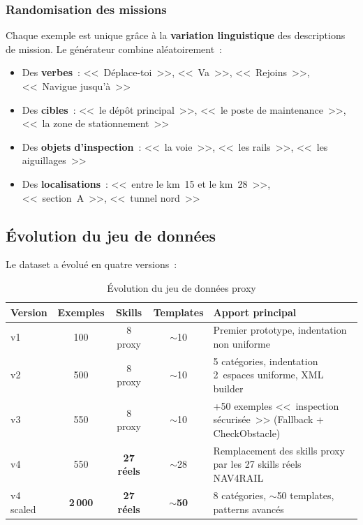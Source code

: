 \documentclass[a4paper,11pt]{article}
\begin{document}
\subsubsection{Randomisation des missions}

Chaque exemple est unique grâce à la \textbf{variation linguistique} des
descriptions de mission. Le générateur combine aléatoirement~:

\begin{itemize}
    \item Des \textbf{verbes}~: <<~Déplace-toi~>>, <<~Va~>>,
    <<~Rejoins~>>, <<~Navigue jusqu'à~>>
    \item Des \textbf{cibles}~: <<~le dépôt principal~>>, <<~le poste de
    maintenance~>>, <<~la zone de stationnement~>>
    \item Des \textbf{objets d'inspection}~: <<~la voie~>>, <<~les rails~>>,
    <<~les aiguillages~>>
    \item Des \textbf{localisations}~: <<~entre le km~15 et le km~28~>>,
    <<~section~A~>>, <<~tunnel nord~>>
\end{itemize}

\subsection{Évolution du jeu de données}

Le dataset a évolué en quatre versions~:

\begin{table}[h]
\centering
\caption{Évolution du jeu de données proxy}
\label{tab:dataset-evolution}
\begin{tabularx}{\textwidth}{@{}l c c c X@{}}
\toprule
\textbf{Version} & \textbf{Exemples} & \textbf{Skills} &
\textbf{Templates} & \textbf{Apport principal} \\
\midrule
v1 & 100 & 8 proxy & $\sim$10 & Premier prototype, indentation
non uniforme \\
v2 & 500 & 8 proxy & $\sim$10 & 5 catégories, indentation 2~espaces
uniforme, XML builder \\
v3 & 550 & 8 proxy & $\sim$10 & +50 exemples <<~inspection
sécurisée~>> (Fallback + CheckObstacle) \\
v4 & 550 & \textbf{27 réels} & $\sim$28 & Remplacement des skills proxy
par les 27 skills réels NAV4RAIL \\
v4 scaled & \textbf{2\,000} & \textbf{27 réels} & $\sim$\textbf{50} &
8 catégories, $\sim$50 templates, patterns avancés \\
\bottomrule
\end{tabularx}
\end{table}
\end{document}

